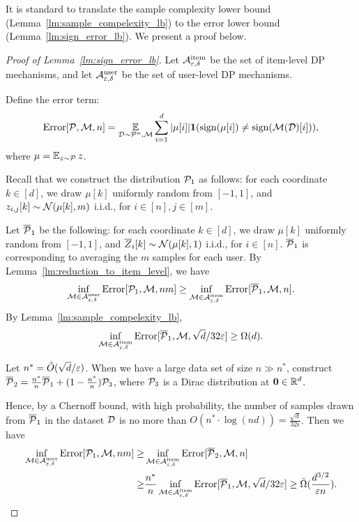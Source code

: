 It is standard to translate the sample complexity lower bound (Lemma~\ref{lm:sample_compelexity_lb}) to the error lower bound (Lemma~\ref{lm:sign_error_lb}).
We present a proof below.


\begin{proof}[Proof of Lemma~\ref{lm:sign_error_lb}]

Let $\PAitem$ be the set of item-level DP mechanisms, and let $\PAuser$ be the set of user-level DP mechanisms.

Define the error term:
\begin{align*}
\Error[\calP,\calM,n]=\E_{\calD\sim\calP^n,\calM}\sum_{i=1}^d|\mu[i]|\ind(\sign(\mu[i])\neq\sign(\calM(\calD)[i])),
\end{align*}
where $\mu=\E_{z\sim\calP}z$.

Recall that we construct the distribution $\calP_1$ as follows: for each coordinate $k\in[d]$, we draw $\mu[k]$ uniformly random from $[-1,1]$, and $z_{i,j}[k]\sim\calN(\mu[k],m)$ i.i.d., for $i\in[n],j\in[m]$.

Let $\bar{\calP}_1$ be the following:
for each coordinate $k\in[d]$, we draw $\mu[k]$ uniformly random from $[-1,1]$, and $\bZ_{i}[k]\sim\calN(\mu[k],1)$ i.i.d., for $i\in[n]$.
$\bar{\calP}_1$ is corresponding to averaging the $m$ samples for each user.
By Lemma~\ref{lm:reduction_to_item_level}, we have
\begin{align*}
    \inf_{\calM\in\PAuser}\Error[\calP_1,\calM,nm]\ge \inf_{\calM\in\PAitem}\Error[\bar{\calP}_1,\calM,n].
\end{align*}
By Lemma~\ref{lm:sample_compelexity_lb},
\begin{align*}
\inf_{\calM\in\PAitem}\Error[\bar{\calP}_1,\calM,\sqrt{d}/32\epsilon]\ge \Omega(d).
\end{align*}

Let $n^*=\Tilde{O}(\sqrt{d}/\epsilon)$.
When we have a large data set of size $n\gg n^*$, construct $\bar{\calP}_2=\frac{n^*}{n}\bar{\calP}_1+(1-\frac{n^*}{n})\calP_3$, where $\calP_3$ is a Dirac distribution at $\mathbf{0}\in\R^d$.

Hence, by a Chernoff bound, with high probability, the number of samples drawn from $\bar{\calP}_1$ in the dataset $\calD$ is no more than $O(n^*\cdot\log(nd))=\frac{\sqrt{d}}{32\epsilon}$.
Then we have
\begin{align*}
    \inf_{\calM\in\PAuser}\Error[\calP_1,\calM,nm]\ge &\inf_{\calM\in\PAitem}\Error[\bar{\calP}_2,\calM,n]\\
    \ge &\frac{n^*}{n}\inf_{\calM\in\PAitem}\Error[\bar{\calP}_1,\calM, \sqrt{d}/32\epsilon]\ge \Tilde{\Omega}(\frac{d^{3/2}}{\epsilon n}).
\end{align*}


\end{proof}
